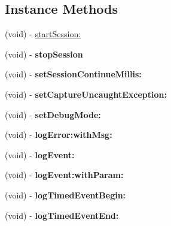 \subsection*{Instance Methods}
\begin{DoxyCompactItemize}
\item 
(void) -\/ \hyperlink{interfaceAnalyticsFlurry_ab1e93c788f45405bea5ed780bd4601ab}{start\+Session\+:}
\item 
\mbox{\label{interfaceAnalyticsFlurry_abf748f9b8a56d9ea3e78015b99199f37}} 
(void) -\/ {\bfseries stop\+Session}
\item 
\mbox{\label{interfaceAnalyticsFlurry_ab4c45d5df5b4cb34510614104cba5888}} 
(void) -\/ {\bfseries set\+Session\+Continue\+Millis\+:}
\item 
\mbox{\label{interfaceAnalyticsFlurry_a2d640dcc110aa893eff0270834b28087}} 
(void) -\/ {\bfseries set\+Capture\+Uncaught\+Exception\+:}
\item 
\mbox{\label{interfaceAnalyticsFlurry_ae1968af6fe9ddf729141ba2bb983a8b9}} 
(void) -\/ {\bfseries set\+Debug\+Mode\+:}
\item 
\mbox{\label{interfaceAnalyticsFlurry_abcb1e7b679f7253a9470cfa33deaff85}} 
(void) -\/ {\bfseries log\+Error\+:with\+Msg\+:}
\item 
\mbox{\label{interfaceAnalyticsFlurry_a20d9223ad1b19fa4aa656b9023ab8a5c}} 
(void) -\/ {\bfseries log\+Event\+:}
\item 
\mbox{\label{interfaceAnalyticsFlurry_a171a7fccc7c12181fb7c07ee8e499c48}} 
(void) -\/ {\bfseries log\+Event\+:with\+Param\+:}
\item 
\mbox{\label{interfaceAnalyticsFlurry_ac9aceea24994da3519136f79f8020866}} 
(void) -\/ {\bfseries log\+Timed\+Event\+Begin\+:}
\item 
\mbox{\label{interfaceAnalyticsFlurry_a32c73d5856064401c00cfc3b14fcef55}} 
(void) -\/ {\bfseries log\+Timed\+Event\+End\+:}
\item 

\end{DoxyCompactItemize}
